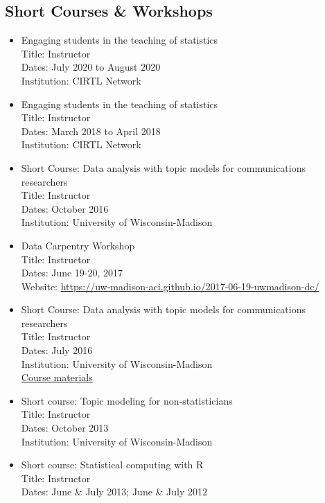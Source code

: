 \subsection*{Short Courses \& Workshops}
\begin{itemize}
\item Engaging students in the teaching of statistics\\
Title: Instructor\\
Dates: July 2020 to August 2020\\
Institution: CIRTL Network
\item Engaging students in the teaching of statistics\\
Title: Instructor\\
Dates: March 2018 to April 2018\\
Institution: CIRTL Network
\item Short Course: Data analysis with topic models for communications researchers\\
Title: Instructor\\
Dates: October 2016\\
Institution: University of Wisconsin-Madison
\item Data Carpentry Workshop\\
Title: Instructor\\
Dates: June 19-20, 2017\\
Website: \url{https://uw-madison-aci.github.io/2017-06-19-uwmadison-dc/}  
\item Short Course: Data analysis with topic models for communications researchers\\
Title: Instructor\\
Dates: July 2016\\
Institution: University of Wisconsin-Madison\\
\href{https://uwmadison.box.com/s/xdxzzip77v8q1ppsgk1cfhmvsgiz3ysq}{Course materials}
\item Short course: Topic modeling for non-statisticians\\
Title: Instructor\\
Dates: October 2013\\
Institution: University of Wisconsin-Madison\\
\item Short course: Statistical computing with R\\
Title: Instructor\\
Dates: June \& July 2013; June \& July 2012
\end{itemize}
